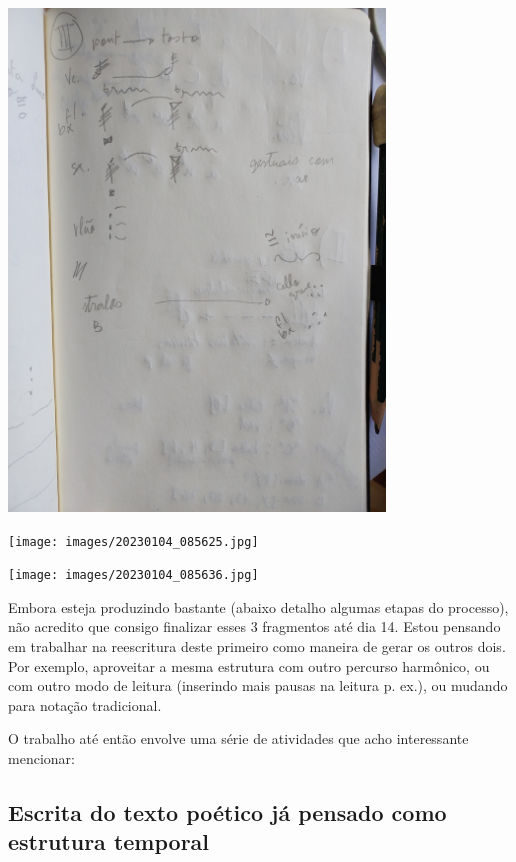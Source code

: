 \documentclass[a4paper, 12pt]{article}
\begin{document}
\begin{center}
\includegraphics[width=10cm]{images/20230104_085609.jpg}
\end{center}

\begin{center}
\texttt{[image: images/20230104\_085625.jpg]}
\end{center}

\begin{center}
\texttt{[image: images/20230104\_085636.jpg]}
\end{center}

Embora esteja produzindo bastante (abaixo detalho algumas etapas do processo), não acredito que consigo finalizar esses 3 fragmentos até dia 14. Estou pensando em trabalhar na reescritura deste primeiro como maneira de gerar os outros dois. Por exemplo, aproveitar a mesma estrutura com outro percurso harmônico, ou com outro modo de leitura (inserindo mais pausas na leitura p. ex.), ou mudando para notação tradicional.

O trabalho até então envolve uma série de atividades que acho interessante mencionar:
\subsection*{Escrita do texto poético já pensado como estrutura temporal}
\label{sec:orgcc94063}
\end{document}
